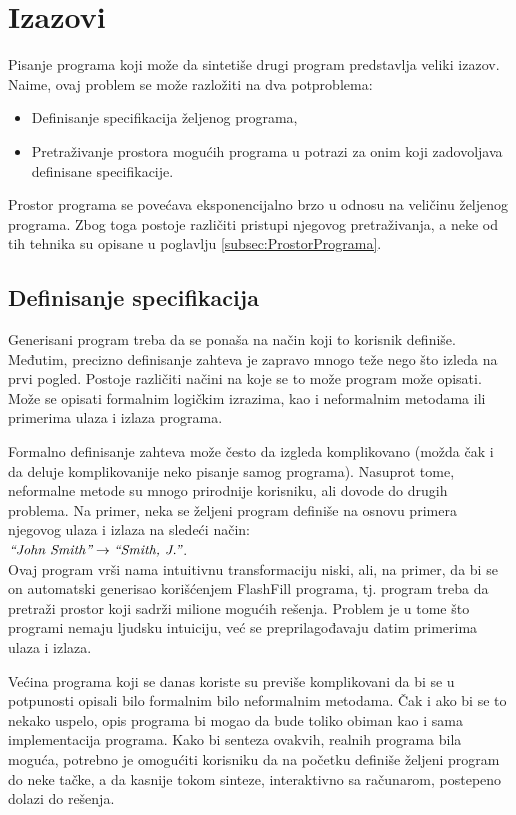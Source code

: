 \section{Izazovi}
\label{sec:Izazovi}

Pisanje programa koji može da sintetiše drugi program predstavlja veliki izazov. Naime, ovaj problem se može razložiti na dva potproblema:

\begin{itemize}
  \item Definisanje specifikacija željenog programa,
  \item Pretraživanje prostora mogućih programa u potrazi za onim koji zadovoljava definisane specifikacije.
\end{itemize}

Prostor programa se povećava eksponencijalno brzo u odnosu na veličinu željenog programa. Zbog toga postoje različiti pristupi njegovog pretraživanja, a neke od tih tehnika su opisane u poglavlju \ref{subsec:ProstorPrograma}. 

\subsection{Definisanje specifikacija}
\label{subsec:DefinisanjeSpecifikacija}

Generisani program treba da se ponaša na način koji to korisnik definiše. Međutim, precizno definisanje zahteva je zapravo mnogo teže nego što izleda na prvi pogled. Postoje različiti načini na koje se to može program može opisati. Može se opisati formalnim logičkim izrazima, kao i neformalnim metodama ili primerima ulaza i izlaza programa.

Formalno definisanje zahteva može često da izgleda komplikovano (možda čak i da deluje komplikovanije neko pisanje samog programa). Nasuprot tome, neformalne metode su mnogo prirodnije korisniku, ali dovode do drugih problema. Na primer, neka se željeni program definiše na osnovu primera njegovog ulaza i izlaza na sledeći način: \\
\(\emph{“John Smith”} \rightarrow \emph{“Smith, J.”}\).\\
Ovaj program vrši nama intuitivnu transformaciju niski, ali, na primer, da bi se on automatski generisao korišćenjem FlashFill \cite{FlashFill} programa, tj. program treba da pretraži prostor koji sadrži milione mogućih rešenja. Problem je u tome što programi nemaju ljudsku intuiciju, već se preprilagođavaju datim primerima ulaza i izlaza.

Većina programa koji se danas koriste su previše komplikovani da bi se u potpunosti opisali bilo formalnim bilo neformalnim metodama. Čak i ako bi se to nekako uspelo, opis programa bi mogao da bude toliko obiman kao i sama implementacija programa. Kako bi senteza ovakvih, realnih programa bila moguća, potrebno je omogućiti korisniku da na početku definiše željeni program do neke tačke, a da kasnije tokom sinteze, interaktivno sa računarom, postepeno dolazi do rešenja.

